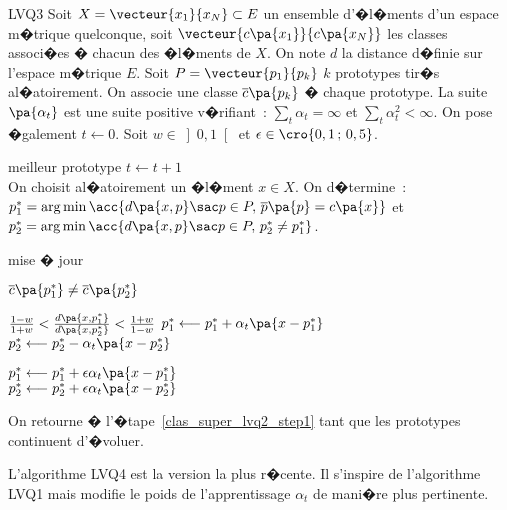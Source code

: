         \begin{xalgorithm}{LVQ3}
        Soit $X = \vecteur{x_1}{x_N} \subset E$ un ensemble d'�l�ments d'un espace m�trique quelconque, 
        soit $\vecteur{c\pa{x_1}}{c\pa{x_N}}$ les classes associ�es � chacun des �l�ments de $X$. On note 
        $d$ la distance d�finie sur l'espace m�trique $E$.
        Soit $P = \vecteur{p_1}{p_k}$ $k$ prototypes tir�s al�atoirement.    
        On associe une classe $\overline{c}\pa{p_k}$ � chaque 
        prototype. La suite $\pa{\alpha_t}$ est une suite positive v�rifiant~: 
        $\sum_t \alpha_t = \infty$ et $\sum_t \alpha_t^2 < \infty$. On pose �galement $t \longleftarrow 0$. 
        Soit $w \in \left]0,1\right[$ et $\epsilon \in \cro{0,1 \,;\, 0,5}$.

        \begin{xalgostep}{meilleur prototype}\label{clas_super_lvq2_step1}
        $t \longleftarrow t +1$ \\
        On choisit al�atoirement un �l�ment $x \in X$. On d�termine~: \\
        $p^*_1 = \arg \min \acc{ d\pa{x,p} \sac p \in P, \, \overline{p}\pa{p} = c\pa{x} }$ et \\
        $p^*_2 = \arg \min \acc{ d\pa{x,p} \sac p \in P, \, p^*_2 \neq p^*_1}$. 
        \end{xalgostep}

        \begin{xalgostep}{mise � jour}
        \begin{xif}{$\overline{c}\pa{p^*_1} \neq \overline{c}\pa{p^*_2}$}
            \begin{xif}{$\frac{1-w}{1+w} < \frac{d\pa{x,p^*_1}}{d\pa{x,p^*_2}} < \frac{1+w}{1-w}$}
                $p^*_1  \longleftarrow p^*_1  + \alpha_t \pa{ x - p^*_1}$ \\
                $p^*_2     \longleftarrow p^*_2  - \alpha_t \pa{ x - p^*_2}$ 
            \end{xif} 
        \xelse
            $p^*_1  \longleftarrow p^*_1  + \epsilon \alpha_t \pa{ x - p^*_1}$ \\
            $p^*_2     \longleftarrow p^*_2  + \epsilon \alpha_t \pa{ x - p^*_2}$ 
        \end{xif}            
        On retourne � l'�tape~\ref{clas_super_lvq2_step1} tant que les prototypes continuent d'�voluer.
        \end{xalgostep}
        \end{xalgorithm}

L'algorithme LVQ4 est la version la plus r�cente. Il s'inspire de l'algorithme LVQ1 mais modifie le poids de l'apprentissage $\alpha_t$ de mani�re plus pertinente.


